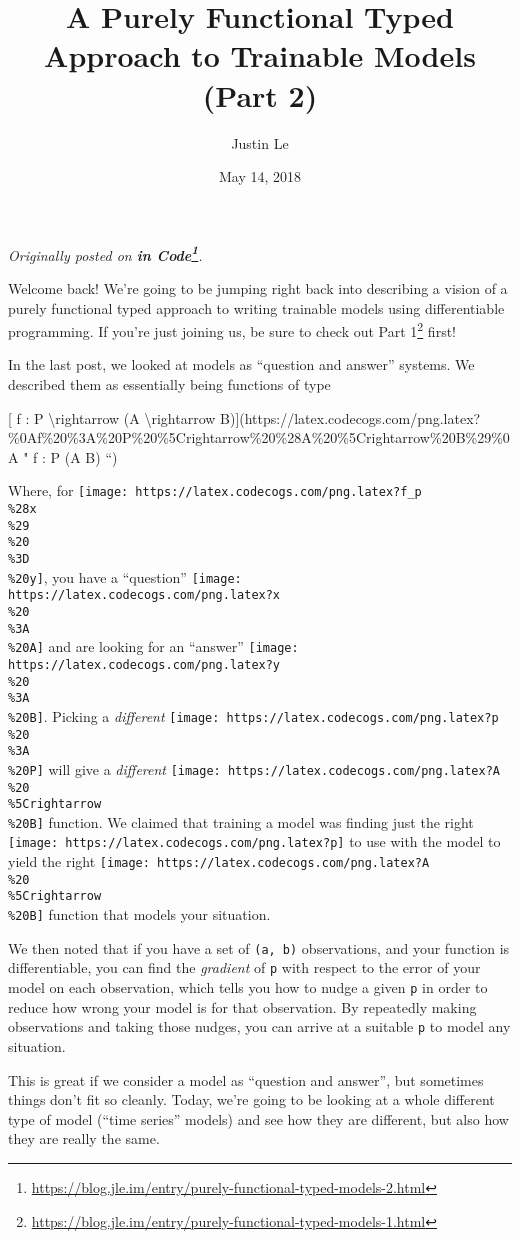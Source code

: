 \documentclass[]{article}
\title{A Purely Functional Typed Approach to Trainable Models (Part 2)}
\author{Justin Le}
\date{May 14, 2018}
\renewcommand{\href}[2]{#2\footnote{\url{#1}}}
\begin{document}
\maketitle

\emph{Originally posted on
\textbf{\href{https://blog.jle.im/entry/purely-functional-typed-models-2.html}{in
Code}}.}

Welcome back! We're going to be jumping right back into describing a vision of a
purely functional typed approach to writing trainable models using
differentiable programming. If you're just joining us, be sure to check out
\href{https://blog.jle.im/entry/purely-functional-typed-models-1.html}{Part 1}
first!

In the last post, we looked at models as ``question and answer'' systems. We
described them as essentially being functions of type

{[} f : P \textbackslash{}rightarrow (A \textbackslash{}rightarrow
B){]}(https://latex.codecogs.com/png.latex?\%0Af\%20\%3A\%20P\%20\%5Crightarrow\%20\%28A\%20\%5Crightarrow\%20B\%29\%0A
" f : P \rightarrow (A \rightarrow B) ``)

Where, for
\texttt{[image: https://latex.codecogs.com/png.latex?f\_p\\\%28x\\\%29\\\%20\\\%3D\\\%20y]},
you have a ``question''
\texttt{[image: https://latex.codecogs.com/png.latex?x\\\%20\\\%3A\\\%20A]} and are
looking for an ``answer''
\texttt{[image: https://latex.codecogs.com/png.latex?y\\\%20\\\%3A\\\%20B]}. Picking a
\emph{different}
\texttt{[image: https://latex.codecogs.com/png.latex?p\\\%20\\\%3A\\\%20P]} will give
a \emph{different}
\texttt{[image: https://latex.codecogs.com/png.latex?A\\\%20\\\%5Crightarrow\\\%20B]}
function. We claimed that training a model was finding just the right
\texttt{[image: https://latex.codecogs.com/png.latex?p]} to use with the model
to yield the right
\texttt{[image: https://latex.codecogs.com/png.latex?A\\\%20\\\%5Crightarrow\\\%20B]}
function that models your situation.

We then noted that if you have a set of \texttt{(a,\ b)} observations, and your
function is differentiable, you can find the \emph{gradient} of \texttt{p} with
respect to the error of your model on each observation, which tells you how to
nudge a given \texttt{p} in order to reduce how wrong your model is for that
observation. By repeatedly making observations and taking those nudges, you can
arrive at a suitable \texttt{p} to model any situation.

This is great if we consider a model as ``question and answer'', but sometimes
things don't fit so cleanly. Today, we're going to be looking at a whole
different type of model (``time series'' models) and see how they are different,
but also how they are really the same.
\end{document}
